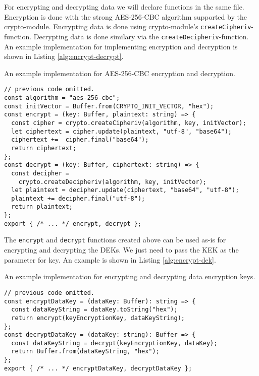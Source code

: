 For encrypting and decrypting data we will declare functions in the same file.
Encryption is done with the strong AES-256-CBC algorithm supported by the crypto-module.
Encrypting data is done using crypto-module's \texttt{createCipheriv}-function.
Decrypting data is done similary via the \texttt{createDecipheriv}-function.
An example implementation for implementing encryption and decryption is shown in Listing \ref{alg:encrypt-decrypt}.

\begin{breakablealgorithm}
\caption{An example implementation for AES-256-CBC encryption and decryption.}
\begin{verbatim}
// previous code omitted.
const algorithm = "aes-256-cbc";
const initVector = Buffer.from(CRYPTO_INIT_VECTOR, "hex");
const encrypt = (key: Buffer, plaintext: string) => {
  const cipher = crypto.createCipheriv(algorithm, key, initVector);
  let ciphertext = cipher.update(plaintext, "utf-8", "base64");
  ciphertext +=  cipher.final("base64");
  return ciphertext;
};
const decrypt = (key: Buffer, ciphertext: string) => {
  const decipher =
    crypto.createDecipheriv(algorithm, key, initVector);
  let plaintext = decipher.update(ciphertext, "base64", "utf-8");
  plaintext += decipher.final("utf-8");
  return plaintext;
};
export { /* ... */ encrypt, decrypt };
\end{verbatim}
\label{alg:encrypt-decrypt}
\end{breakablealgorithm}

The \texttt{encrypt} and \texttt{decrypt} functions created above can be used as-is for encrypting and decrypting the DEKs.
We just need to pass the KEK as the parameter for key.
An example is shown in Listing \ref{alg:encrypt-dek}.

\begin{breakablealgorithm}
\caption{An example implementation for encrypting and decrypting data encryption keys.}
\begin{verbatim}
// previous code omitted.
const encryptDataKey = (dataKey: Buffer): string => {
  const dataKeyString = dataKey.toString("hex");
  return encrypt(keyEncryptionKey, dataKeyString);
};
const decryptDataKey = (dataKey: string): Buffer => {
  const dataKeyString = decrypt(keyEncryptionKey, dataKey);
  return Buffer.from(dataKeyString, "hex");
};
export { /* ... */ encryptDataKey, decryptDataKey };
\end{verbatim}
\label{alg:encrypt-dek}
\end{breakablealgorithm}

